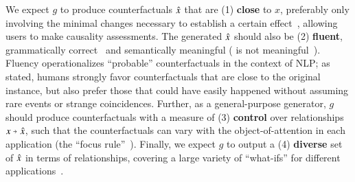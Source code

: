 We expect $g$ to produce counterfactuals $\hat{x}$ that are (1) \textbf{close} to $x$, preferably only involving the minimal changes necessary to establish a certain effect~\cite{pearl2018causal}, allowing users to make causality assessments.
The generated $\hat{x}$ should also be (2) \textbf{fluent}, \ie grammatically correct~\cite{morris2020textattack} and semantically meaningful (\eg {} is not meaningful~\cite{chomsky2002syntactic}).
Fluency operationalizes ``probable'' counterfactuals in the context of NLP;
as \citet{kahneman} stated, humans strongly favor counterfactuals that are close to the original instance, but also prefer those that could have easily happened without assuming rare events or strange coincidences.
Further, as a general-purpose generator, $g$ should produce counterfactuals with a measure of (3) \textbf{control} over relationships $x \veryshortarrow \xp$,  %
such that the counterfactuals can vary with the object-of-attention in each application (the ``focus rule''~\cite{kahneman}).
Finally, %
we expect $g$ to output a (4) \textbf{diverse} set of $\hat{x}$ in terms of relationships, covering a large variety of ``what-ifs'' for different applications~\cite{pearl2018causal}.


\TagTable


